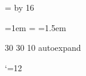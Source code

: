 \newdimen\logobarthickness
\logobarthickness=\logofont
\divide\logobarthickness by 16
\def\logolineskip{\vskip4\logobarthickness}

\def\stackedlogo#1#2{%
  \begingroup%
  \offinterlineskip%
  \logofont%
  \setbox0=\hbox{DRISCOLL}%
  \vbox{%
    \hrule height \logobarthickness%
    \logolineskip%
    \copy0%
    \logolineskip%
    \hbox to \wd0{#1BROOK#2}%
    \logolineskip%
    \hbox to \wd0{#1PRESS#2}%
    \logolineskip%
    \hrule height \logobarthickness%
  }%
  \endgroup%
}

\def\leftlogo{\stackedlogo{}{\hss}}
\def\centerlogo{\stackedlogo{\hss}{\hss}}
\def\rightlogo{\stackedlogo{\hss}{}}

\def\linelogo{%
  \begingroup%
  \offinterlineskip%
  \logofont%
  \vbox{%
    \hrule height \logobarthickness%
    \logolineskip%
    \hbox{DRISCOLL BROOK PRESS}%
    \logolineskip%
    \hrule height \logobarthickness%
  }%
  \endgroup%
}

%
%

\def\raggedleft{\parindent=0pt\parfillskip=0pt\leftskip=0pt plus \hsize\relax}
\def\raggedright{\parindent=0pt\parfillskip=0pt\rightskip=0pt plus \hsize\relax}
\def\centered{\raggedleft\raggedright}
\newdimen\leading \leading=15pt

\def\authorinfoheading#1{\bigskip\bigskip{\sc\centered#1\par}}
\def\authorinfoitem#1{\medskip{\centered#1\par}}
\def\connect#1#2{\authorinfoheading{#1}\authorinfoitem{#2}}
\def\genre#1{\authorinfoheading{#1}}
\def\genrebook#1{\authorinfoitem{#1}}

\def\titlespacing{\baselineskip=1.1\fontdimen6\the\font}
\parindent=1em
\normalbaselineskip=\leading
\normalbaselines
\emergencystretch=1.5em


%
%

\def\emph#1{{\it #1}}

\def\leadin#1{\nobreak\noindent{\sc #1}}
\rm

%
%

\pdffontexpand\rm 30 30 10 autoexpand

\catcode`\@=12
